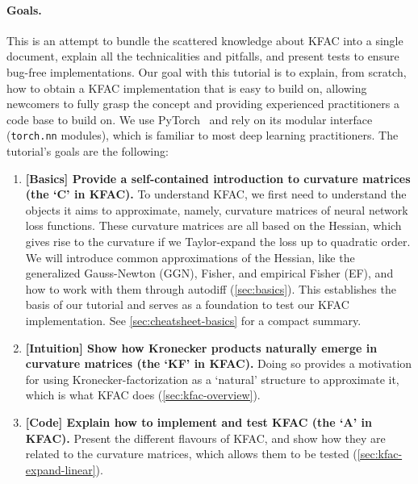 \paragraph{Goals.}
This is an attempt to bundle the scattered knowledge about KFAC into a single document, explain all the technicalities and pitfalls, and present tests to ensure bug-free implementations.
Our goal with this tutorial is to explain, from scratch, how to obtain a KFAC implementation that is easy to build on, allowing newcomers to fully grasp the concept and providing experienced practitioners a code base to build on.
We use PyTorch~\cite{paszke2019pytorch} and rely on its modular interface (\texttt{torch.nn} modules), which is familiar to most deep learning practitioners.
The tutorial's goals are the following:
\begin{enumerate}
\item \textbf{[Basics] Provide a self-contained introduction to curvature matrices (the `C' in KFAC).}
  To understand KFAC, we first need to understand the objects it aims to approximate, namely, curvature matrices of neural network loss functions.
  These curvature matrices are all based on the Hessian, which gives rise to the curvature if we Taylor-expand the loss up to quadratic order.
  We will introduce common approximations of the Hessian, like the generalized Gauss-Newton (GGN), Fisher, and empirical Fisher (EF), and how to work with them through autodiff (\cref{sec:basics}).
  This establishes the basis of our tutorial and serves as a foundation to test our KFAC implementation.
  See \cref{sec:cheatsheet-basics} for a compact summary.

\item \textbf{[Intuition] Show how Kronecker products naturally emerge in curvature matrices (the `KF' in KFAC).}
  Doing so provides a motivation for using Kronecker-factorization as a `natural' structure to approximate it, which is what KFAC does (\cref{sec:kfac-overview}).

\item \textbf{[Code] Explain how to implement and test KFAC (the `A' in KFAC).}
  Present the different flavours of KFAC, and show how they are related to the curvature matrices, which allows them to be tested (\cref{sec:kfac-expand-linear}).
\end{enumerate}

